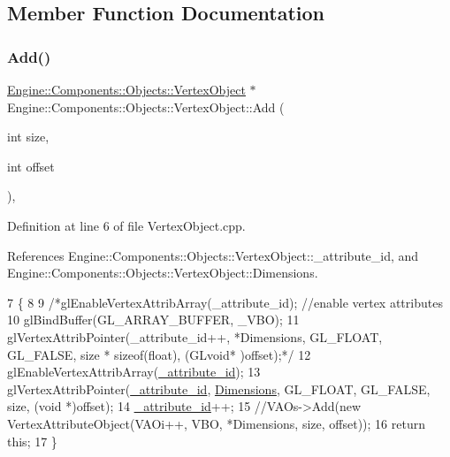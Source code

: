\subsection{Member Function Documentation}
\mbox{\label{classEngine_1_1Components_1_1Objects_1_1VertexObject_a18550cae56ca1066792528a7dcf5d28a}} 
\subsubsection{\texorpdfstring{Add()}{Add()}}
{\footnotesize\ttfamily \mbox{\hyperlink{classEngine_1_1Components_1_1Objects_1_1VertexObject}{Engine\+::\+Components\+::\+Objects\+::\+Vertex\+Object}} $\ast$ Engine\+::\+Components\+::\+Objects\+::\+Vertex\+Object\+::\+Add (\begin{DoxyParamCaption}\item[{int}]{size,  }\item[{int}]{offset }\end{DoxyParamCaption})\hspace{0.3cm}{\ttfamily [protected]}, {\ttfamily [inherited]}}



Definition at line 6 of file Vertex\+Object.\+cpp.



References Engine\+::\+Components\+::\+Objects\+::\+Vertex\+Object\+::\+\_\+attribute\+\_\+id, and Engine\+::\+Components\+::\+Objects\+::\+Vertex\+Object\+::\+Dimensions.


\begin{DoxyCode}
7 \{
8 
9     \textcolor{comment}{/*glEnableVertexAttribArray(\_attribute\_id); //enable vertex attributes}
10 \textcolor{comment}{    glBindBuffer(GL\_ARRAY\_BUFFER, \_VBO);}
11 \textcolor{comment}{    glVertexAttribPointer(\_attribute\_id++, *Dimensions, GL\_FLOAT, GL\_FALSE, size * sizeof(float), (GLvoid*
      )offset);*/}
12     glEnableVertexAttribArray(\mbox{\hyperlink{classEngine_1_1Components_1_1Objects_1_1VertexObject_a401aa1eb0254e57d8295c2287749eed5}{\_attribute\_id}});
13     glVertexAttribPointer(\mbox{\hyperlink{classEngine_1_1Components_1_1Objects_1_1VertexObject_a401aa1eb0254e57d8295c2287749eed5}{\_attribute\_id}}, \mbox{\hyperlink{classEngine_1_1Components_1_1Objects_1_1VertexObject_ae5bb104a878dc8a3c909ec9b0ee799c1}{Dimensions}}, GL\_FLOAT, GL\_FALSE, size, (\textcolor{keywordtype}{void}
      *)offset);
14     \mbox{\hyperlink{classEngine_1_1Components_1_1Objects_1_1VertexObject_a401aa1eb0254e57d8295c2287749eed5}{\_attribute\_id}}++;
15     \textcolor{comment}{//VAOs->Add(new VertexAttributeObject(VAOi++, VBO, *Dimensions, size, offset));}
16     \textcolor{keywordflow}{return} \textcolor{keyword}{this};
17 \}
\end{DoxyCode}
\mbox{\label{classEngine_1_1Objects_1_1Sphere_a7cc1ef27c2634c763273ed84065b217a}} 
